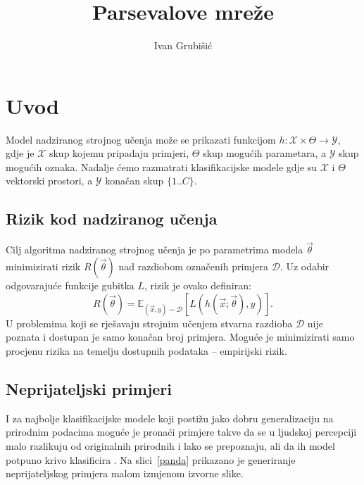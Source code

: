 \documentclass[utf8, seminar, numeric, lmodern]{feri}
\begin{document}
\title{Parsevalove mreže}

\author{Ivan Grubišić}

\maketitle

\thispagestyle{empty}
\clearpage
{
	\hypersetup{linkcolor=black}
	\tableofcontents
}



\chapter{Uvod}

Model nadziranog strojnog učenja može se prikazati funkcijom $h:\mathcal{X}\times\Theta\to\mathcal{Y}$, gdje je $\mathcal{X}$ skup kojemu pripadaju primjeri, $\Theta$ skup mogućih parametara, a $\mathcal{Y}$ skup mogućih oznaka. Nadalje ćemo razmatrati klasifikacijske modele gdje su $\mathcal{X}$ i $\Theta$ vektorski prostori, a $\mathcal{Y}$ konačan skup $\{1..C\}$.

\section{Rizik kod nadziranog učenja}

Cilj algoritma nadziranog strojnog učenja je po parametrima modela $\vec\theta$ minimizirati rizik $R(\vec\theta)$ nad razdiobom označenih primjera $\mathcal{D}$. Uz odabir odgovarajuće funkcije gubitka $L$, rizik je ovako definiran:
\begin{equation}
R(\vec\theta) = \mathbb{E}_{(\vec x,y)\sim\mathcal{D}}\left[L(h(\vec x;\vec\theta), y)\right].
\end{equation}
U problemima koji se rješavaju strojnim učenjem stvarna razdioba $\mathcal{D}$ nije poznata i dostupan je samo konačan broj primjera. Moguće je minimizirati samo procjenu rizika na temelju dostupnih podataka -- empirijski rizik.

\section{Neprijateljski primjeri}

I za najbolje klasifikacijske modele koji postižu jako dobru generalizaciju na prirodnim podacima moguće je pronaći primjere takve da se u ljudskoj percepciji malo razlikuju od originalnih prirodnih i lako se prepoznaju, ali da ih model potpuno krivo klasificira \cite{szegedy13-intrig-ipnn, goodfellow14-ehae}. Na slici~\ref{panda} prikazano je generiranje neprijateljskog primjera malom izmjenom izvorne slike.
\end{document}
